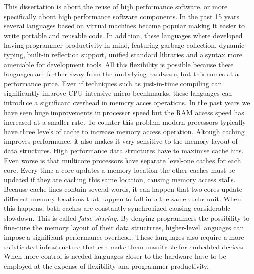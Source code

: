 This dissertation is about the reuse of high performance software, or more specifically about
high performance software components. In the past 15 years several languages
based on virtual machines became popular making it easier to write portable and reusable code.
In addition, these languages where developed having programmer productivity in mind, featuring garbage
collection, dynamic typing, built-in reflection support, unified standard libraries and a syntax more
ameniable for development tools. All this flexibility is possible because these languages are farther
away from the underlying hardware, but this comes at a performance price. Even if techniques such
as just-in-time compiling \cite{Aycock} can significantly improve CPU intensive micro-becnhmarks,
these languages can introduce a significant overhead in memory acces operations. In the past
years we have seen huge improvements in processor speed but the RAM access speed has increased at
a smaller rate. To counter this problem modern processors typically have three levels of cache to increase
memory access operation. Altough caching improves performance, it also makes it very sensitive to the memory
layout of data structures. High performance data structures have to maximise cache hits. Even worse
is that multicore processors have separate level-one caches for each core. Every time a core updates
a memory location the other caches must be updated if they are caching this same location, causing
memory access stalls. Because cache lines contain several words, it can happen that two cores update
different memory locations that happen to fall into the same cache unit. When this happens, both caches
are constantly synchronized causing considerable slowdown. This is called \emph{false sharing}.
By denying programmers the possibility to fine-tune the memory layout of their data structures,
higher-level languages can impose a significant performance overhead. These languages also require
a more sofisticated infrastructure that can make them unsuitable for embedded devices.
When more control is needed languages closer to the hardware have to be employed at the expense
of flexibility and programmer productivity.

